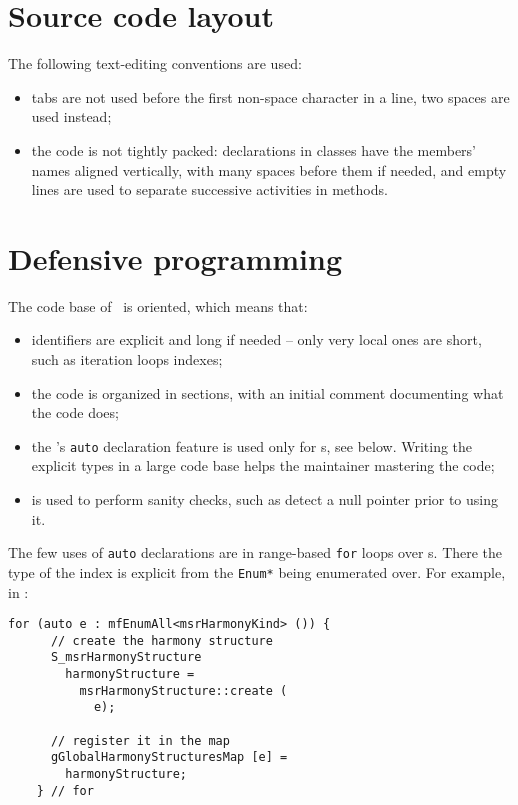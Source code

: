 \section{Source code layout}

The following text-editing conventions are used:
\begin{itemize}
\item tabs are not used before the first non-space character in a line, two spaces are used instead;

\item the code is not tightly packed: declarations in classes have the members' names aligned vertically, with many spaces before them if needed, and empty lines are used to separate successive activities in methods.
\end{itemize}


\section{Defensive programming}

The code base of \xmlToLy\ is  oriented, which means that:
\begin{itemize}
\item identifiers are explicit and long if needed -- only very local ones are short, such as iteration loops indexes;

\item the code is organized in sections, with an initial comment documenting what the code does;

\item the \CPlusplus 's {\tt auto} declaration feature is used only for \enumType s, see below. Writing the explicit types in a large code base helps the maintainer mastering the code;

\item {} is used to perform sanity checks, such as detect a null pointer prior to using it.
\end{itemize}

The few uses of {\tt auto} declarations are in range-based {\tt for} loops over \enumType s. There the type of the index is explicit from the {\tt Enum*} being enumerated over. For example, in :
\begin{lstlisting}[language=CPlusPlus]
    for (auto e : mfEnumAll<msrHarmonyKind> ()) {
      // create the harmony structure
      S_msrHarmonyStructure
        harmonyStructure =
          msrHarmonyStructure::create (
            e);

      // register it in the map
      gGlobalHarmonyStructuresMap [e] =
        harmonyStructure;
    } // for
\end{lstlisting}

